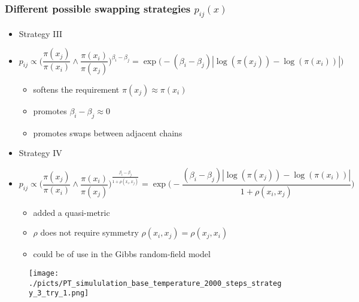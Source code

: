 \begin{frame}
		\frametitle{ Different possible swapping strategies $p_{ij}( x )$ }

	\begin{itemize}
		\item[] Strategy III 
		\item[] 
	$$p_{ij} \propto \Big( \frac{\pi (x_j)}{\pi( x_i )} \wedge \frac{\pi (x_i)}{\pi( x_j )} \Big)^{\beta_i - \beta_j} = \exp \Big( - (\beta_i - \beta_j)| \log ( \pi(x_j) ) - \log ( \pi(x_i) ) | \Big)$$
		\begin{itemize}		
 			\item softens the requirement  $\pi (x_j) \approx \pi (x_i)$
			\item promotes $\beta_i - \beta_j \approx 0$ 
			\item promotes swaps between adjacent chains 
		\end{itemize}
	
		\item[] Strategy IV 
		\item[] 
	$$p_{ij} \propto \Big( \frac{\pi (x_j)}{\pi( x_i )} \wedge \frac{\pi (x_i)}{\pi( x_j )} \Big)^\frac{\beta_i - \beta_j}{1 + \rho(x_i, x_j)} = \exp \Big( - \frac{(\beta_i - \beta_j)| \log ( \pi(x_j) ) - \log ( \pi(x_i) ) |}{{1 + \rho(x_i, x_j)}} \Big)$$
		\begin{itemize}		
 			\item added a quasi-metric 
			\item $\rho$ does not require symmetry $\rho(x_i, x_j) = \rho(x_j, x_i)$  
			\item could be of use in the Gibbs random-field model
		\end{itemize}

	\end{itemize}

\end{frame}


\begin{frame}[plain]

	\begin{center}
		\begin{figure}\texttt{[image: ./picts/PT\_simululation\_base\_temperature\_2000\_steps\_strategy\_3\_try\_1.png]}\end{figure}	
	\end{center}	
		
\end{frame}

